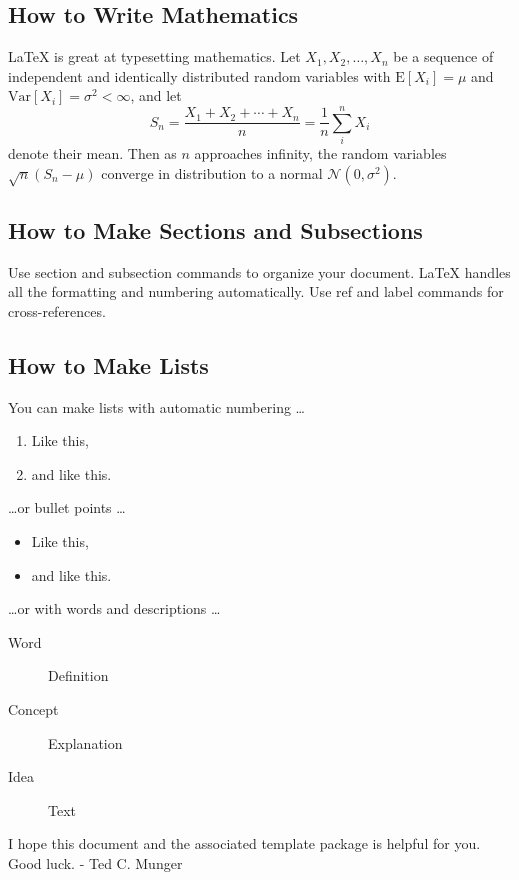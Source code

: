 \documentclass[a4paper]{article}
\begin{document}
\subsection{How to Write Mathematics}

\LaTeX {}{} is great at typesetting mathematics. Let $X_1, X_2, \ldots, X_n$ be a sequence of independent and identically distributed random variables with $\text{E}[X_i] = \mu$ and $\text{Var}[X_i] = \sigma^2 < \infty$, and let
$$S_n = \frac{X_1 + X_2 + \cdots + X_n}{n}
      = \frac{1}{n}\sum_{i}^{n} X_i$$
denote their mean. Then as $n$ approaches infinity, the random variables $\sqrt{n}(S_n - \mu)$ converge in distribution to a normal $\mathcal{N}(0, \sigma^2)$.

\subsection{How to Make Sections and Subsections}

Use section and subsection commands to organize your document. \LaTeX {}{} handles all the formatting and numbering automatically. Use ref and label commands for cross-references.

\subsection{How to Make Lists}

You can make lists with automatic numbering \dots

\begin{enumerate}
\item Like this,
\item and like this.
\end{enumerate}
\dots or bullet points \dots
\begin{itemize}
\item Like this,
\item and like this.
\end{itemize}
\dots or with words and descriptions \dots
\begin{description}
\item[Word] Definition
\item[Concept] Explanation
\item[Idea] Text
\end{description}

\bigskip

I hope this document and the associated template package is helpful for you.  Good luck.
- Ted C. Munger
\end{document}
